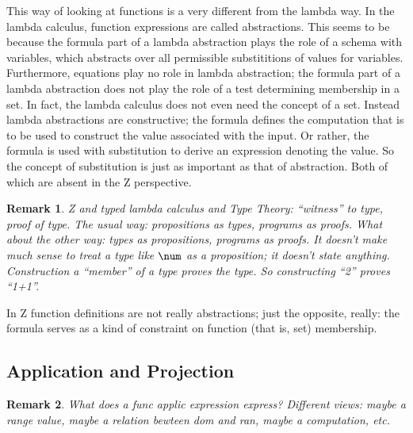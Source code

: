 \documentclass[12pt]{tufte-handout}
\numberwithin{equation}{subsection}
\numberwithin{equation}{subsection}
\newtheorem{remark}{Remark}
\begin{document}
  This way of looking at functions is a very different from the lambda
  way.  In the lambda calculus, function expressions are called
  abstractions.  This seems to be because the formula part of a lambda
  abstraction plays the role of a schema with variables, which
  abstracts over all permissible substititions of values for
  variables.  Furthermore, equations play no role in lambda
  abstraction; the formula part of a lambda abstraction does not play
  the role of a test determining membership in a set.  In fact, the
  lambda calculus does not even need the concept of a
  set.  Instead lambda abstractions are constructive; the formula
  defines the computation that is to be used to construct the value
  associated with the input.  Or rather, the formula is used with
  substitution to derive an expression denoting the value.  So the
  concept of substitution is just as important as that of abstraction.
  Both of which are absent in the Z perspective.

  \begin{remark}
    Z and typed lambda calculus and Type Theory: ``witness'' to type,
    proof of type.  The usual way: propositions as types, programs as
    proofs.  What about the other way: types as propositions, programs
    as proofs.  It doesn't make much sense to treat a type like
    \(\num\) as a proposition; it doesn't state anything.
    Construction a ``member'' of a type proves the type.  So
    constructing ``2'' proves ``1+1''.
  \end{remark}

  In Z function definitions are not really abstractions; just the
  opposite, really: the formula serves as a kind of constraint on
  function (that is, set) membership.

  \subsection{Application and Projection}
  \label{subs:}

  \begin{remark}
    What does a func applic expression express?  Different views:
    maybe a range value, maybe a relation bewteen dom and ran, maybe a
    computation, etc.
  \end{remark}
\end{document}
